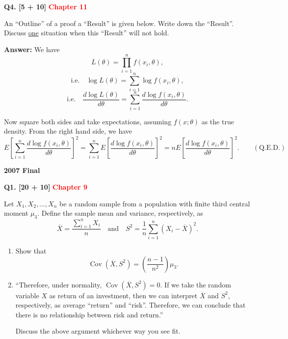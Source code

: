 \documentclass[11pt]{article}
\begin{document}
\bigskip

\textbf{Q4. [5 + 10]} \textbf{\textcolor{red}{Chapter 11}}

An ``Outline'' of a proof a ``Result'' is given below. Write down the ``Result''. Discuss \underline{one} situation when this ``Result'' will not hold.

\textbf{Answer:} We have
\[
L(\theta)=\prod_{i=1}^n f(x_i,\theta),
\]
\[
\text{i.e.}\quad \log L(\theta)=\sum_{i=1}^n\log f(x_i,\theta),
\]
\[
\text{i.e.}\quad \frac{d\log L(\theta)}{d\theta}
=\sum_{i=1}^n\frac{d\log f(x_i,\theta)}{d\theta}.
\]

Now square both sides and take expectations, assuming $f(x;\theta)$ as the true density. From the right hand side, we have
\[
E\!\left[\sum_{i=1}^n\frac{d\log f(x_i,\theta)}{d\theta}\right]^2
=\sum_{i=1}^n E\!\left[\frac{d\log f(x_i,\theta)}{d\theta}\right]^2
=nE\!\left[\frac{d\log f(x_i,\theta)}{d\theta}\right]^2.
\qquad (\text{Q.E.D.})
\]

\clearpage

\begin{center}
    {\Large\bfseries 2007 Final}
\end{center}

\vspace{1em}

\textbf{Q1. [20 + 10]} \textbf{\textcolor{red}{Chapter 9}}

Let $X_1,X_2,\ldots,X_n$ be a random sample from a population with finite third central moment $\mu_3$. Define the sample mean and variance, respectively, as
\[
\overline X=\frac{\sum_{i=1}^n X_i}{n}
\quad\text{and}\quad
S^2=\frac{1}{n}\sum_{i=1}^n(X_i-\overline X)^2.
\]

\begin{enumerate}
\item[(a)] Show that
\[
\operatorname{Cov}(\overline X,S^2)=\left(\frac{n-1}{n^2}\right)\mu_3.
\]

\item[(b)] ``Therefore, under normality, $\operatorname{Cov}(\overline X,S^2)=0$. If we take the random variable $X$ as return of an investment, then we can interpret $\overline X$ and $S^2$, respectively, as average ``return'' and ``risk''. Therefore, we can conclude that there is no relationship between risk and return.''

Discuss the above argument whichever way you see fit.
\end{enumerate}
\end{document}
